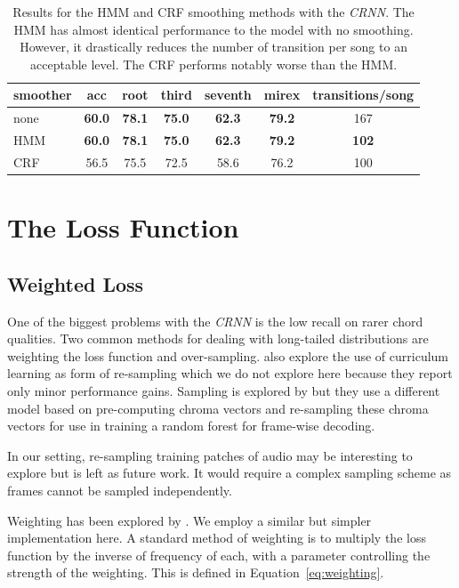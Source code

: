 \begin{table}[ht]
    \centering
    \begin{tabular}{lcccccc}
        \toprule
        smoother & acc & root & third & seventh & mirex & transitions/song\\  
        \midrule
        none & \textbf{60.0} & \textbf{78.1} & \textbf{75.0} & \textbf{62.3} & \textbf{79.2} & 167 \\
        HMM & \textbf{60.0} &\textbf{78.1} & \textbf{75.0} & \textbf{62.3} & \textbf{79.2} & \textbf{102} \\
        CRF & 56.5 & 75.5 & 72.5 & 58.6 & 76.2 & 100 \\
        \bottomrule
    \end{tabular}
    \caption{Results for the HMM and CRF smoothing methods with the \emph{CRNN}. The HMM has almost identical performance to the model with no smoothing. However, it drastically reduces the number of transition per song to an acceptable level. The CRF performs notably worse than the HMM. }\label{tab:smoothers}
\end{table}

\section{The Loss Function}

\subsection{Weighted Loss}\label{sec:weighted_loss}

One of the biggest problems with the \emph{CRNN} is the low recall on rarer chord qualities. Two common methods for dealing with long-tailed distributions are weighting the loss function and over-sampling. \citet{CurriculumLearning} also explore the use of curriculum learning as form of re-sampling which we do not explore here because they report only minor performance gains. Sampling is explored by \citet{BalanceRandomForestACR} but they use a different model based on pre-computing chroma vectors and re-sampling these chroma vectors for use in training a random forest for frame-wise decoding. 

In our setting, re-sampling training patches of audio may be interesting to explore but is left as future work. It would require a complex sampling scheme as frames cannot be sampled independently. 

Weighting has been explored by \citet{ACRLargeVocab1}. We employ a similar but simpler implementation here. A standard method of weighting is to multiply the loss function by the inverse of frequency of each, with a parameter controlling the strength of the weighting. This is defined in Equation~\ref{eq:weighting}.

